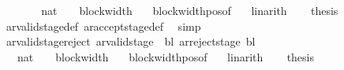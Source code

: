 \begin{isabellebody}
%
\isadelimproof
%
\endisadelimproof
%
\isatagproof
{}\isamarkupfalse%
\ {\isacharminus}{\kern0pt}\isanewline
\ \ \isamarkupfalse%
\ {\isachardoublequoteopen}{\isacharparenleft}{\kern0pt}{}\ {\isacharcolon}{\kern0pt}{\isacharcolon}{\kern0pt}\ nat{\isacharparenright}{\kern0pt}\ {\isacharless}{\kern0pt}\ {}\ {\isacharasterisk}{\kern0pt}\ block{\isacharunderscore}{\kern0pt}width\ {\isasymGamma}{\isachardoublequoteclose}\ \isamarkupfalse%
\ block{\isacharunderscore}{\kern0pt}width{\isacharunderscore}{\kern0pt}pos{\isacharbrackleft}{\kern0pt}of\ {\isasymGamma}{\isacharbrackright}{\kern0pt}\ \isamarkupfalse%
\ linarith\isanewline
\ \ \isamarkupfalse%
\ {\isacharquery}{\kern0pt}thesis\isanewline
\ \ \ \ \isamarkupfalse%
\ ar{\isacharunderscore}{\kern0pt}valid{\isacharunderscore}{\kern0pt}stage{\isacharunderscore}{\kern0pt}def\ ar{\isacharunderscore}{\kern0pt}accept{\isacharunderscore}{\kern0pt}stage{\isacharunderscore}{\kern0pt}def\ \isamarkupfalse%
\ simp\isanewline
{}\isamarkupfalse%
%
\endisatagproof
{\isafoldproof}%
%
\isadelimproof
\isanewline
%
\endisadelimproof
\isanewline
{}\isamarkupfalse%
\ ar{\isacharunderscore}{\kern0pt}valid{\isacharunderscore}{\kern0pt}stage{\isacharunderscore}{\kern0pt}reject{\isacharcolon}{\kern0pt}\ {\isachardoublequoteopen}ar{\isacharunderscore}{\kern0pt}valid{\isacharunderscore}{\kern0pt}stage\ {\isasymGamma}\ bl\ {\isacharparenleft}{\kern0pt}ar{\isacharunderscore}{\kern0pt}reject{\isacharunderscore}{\kern0pt}stage\ bl{\isacharparenright}{\kern0pt}{\isachardoublequoteclose}\isanewline
%
\isadelimproof
%
\endisadelimproof
%
\isatagproof
{}\isamarkupfalse%
\ {\isacharminus}{\kern0pt}\isanewline
\ \ \isamarkupfalse%
\ {\isachardoublequoteopen}{\isacharparenleft}{\kern0pt}{}\ {\isacharcolon}{\kern0pt}{\isacharcolon}{\kern0pt}\ nat{\isacharparenright}{\kern0pt}\ {\isacharless}{\kern0pt}\ {}\ {\isacharasterisk}{\kern0pt}\ block{\isacharunderscore}{\kern0pt}width\ {\isasymGamma}{\isachardoublequoteclose}\ \isamarkupfalse%
\ block{\isacharunderscore}{\kern0pt}width{\isacharunderscore}{\kern0pt}pos{\isacharbrackleft}{\kern0pt}of\ {\isasymGamma}{\isacharbrackright}{\kern0pt}\ \isamarkupfalse%
\ linarith\isanewline
\ \ \isamarkupfalse%
\ {\isacharquery}{\kern0pt}thesis\isanewline
\ \ \ \ \isamarkupfalse%

\end{isabellebody}
